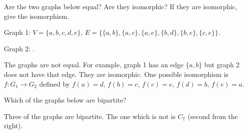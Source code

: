 \begin{questions}
\question Are the two graphs below equal?  Are they isomorphic?  If they are isomorphic, give the isomorphism.

Graph 1: $V = \{a,b,c,d,e\}$, $E = \{\{a,b\}, \{a,c\}, \{a,e\}, \{b,d\}, \{b,e\}, \{c,e\}\}$.

Graph 2: .


	\begin{answer}
		The graphs are not equal.  For example, graph 1 has an edge $\{a,b\}$ but graph 2 does not have that edge.  They are isomorphic.  One possible isomorphism is $f:G_1 \to G_2$ defined by $f(a) = d$, $f(b) = c$, $f(c) = e$, $f(d) = b$, $f(e) = a$.
	\end{answer}

















\question Which of the graphs below are bipartite?

\begin{center}
  \hfill
  \hfill
  \hfill
\end{center}

	\begin{answer}
		Three of the graphs are bipartite.  The one which is not is $C_7$ (second from the right).
	\end{answer}






\end{questions}
